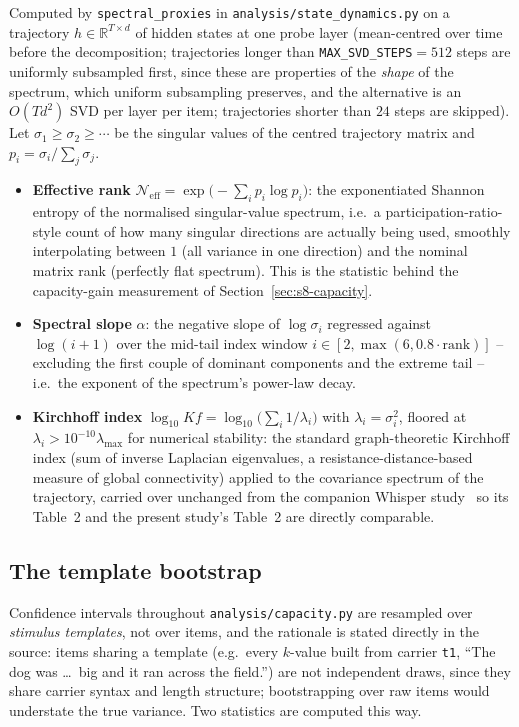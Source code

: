\documentclass[11pt]{article}
\begin{document}
Computed by \texttt{spectral\_proxies} in \texttt{analysis/state\_dynamics.py}
on a trajectory $h \in \mathbb{R}^{T\times d}$ of hidden states at one probe
layer (mean-centred over time before the decomposition; trajectories longer
than \texttt{MAX\_SVD\_STEPS}$=512$ steps are uniformly subsampled first,
since these are properties of the \emph{shape} of the spectrum, which
uniform subsampling preserves, and the alternative is an $O(Td^2)$ SVD per
layer per item; trajectories shorter than $24$ steps are skipped). Let
$\sigma_1\ge\sigma_2\ge\cdots$ be the singular values of the centred
trajectory matrix and $p_i = \sigma_i/\sum_j\sigma_j$.

\begin{itemize}
\item \textbf{Effective rank} $\mathcal{N}_{\mathrm{eff}} =
  \exp\!\big(-\sum_i p_i\log p_i\big)$: the exponentiated Shannon entropy of
  the normalised singular-value spectrum, i.e.\ a participation-ratio-style
  count of how many singular directions are actually being used, smoothly
  interpolating between $1$ (all variance in one direction) and the nominal
  matrix rank (perfectly flat spectrum). This is the statistic behind the
  capacity-gain measurement of Section~\ref{sec:s8-capacity}.
\item \textbf{Spectral slope} $\alpha$: the negative slope of $\log\sigma_i$
  regressed against $\log(i+1)$ over the mid-tail index window
  $i \in [2, \max(6, 0.8\cdot\text{rank})]$ -- excluding the first couple of
  dominant components and the extreme tail -- i.e.\ the exponent of the
  spectrum's power-law decay.
\item \textbf{Kirchhoff index} $\log_{10} Kf = \log_{10}\!\big(\sum_i
  1/\lambda_i\big)$ with $\lambda_i=\sigma_i^2$, floored at
  $\lambda_i > 10^{-10}\lambda_{\max}$ for numerical stability: the standard
  graph-theoretic Kirchhoff index (sum of inverse Laplacian eigenvalues, a
  resistance-distance-based measure of global connectivity) applied to the
  covariance spectrum of the trajectory, carried over unchanged from the
  companion Whisper study~\cite{viakhirev2026dispersion} so its Table~2 and
  the present study's Table~2 are directly comparable.
\end{itemize}

\subsection{The template bootstrap}

Confidence intervals throughout \texttt{analysis/capacity.py} are resampled
over \emph{stimulus templates}, not over items, and the rationale is stated
directly in the source: items sharing a template (e.g.\ every $k$-value built
from carrier \texttt{t1}, ``The dog was \dots\ big and it ran across the
field.'') are not independent draws, since they share carrier syntax and
length structure; bootstrapping over raw items would understate the true
variance. Two statistics are computed this way.
\end{document}
